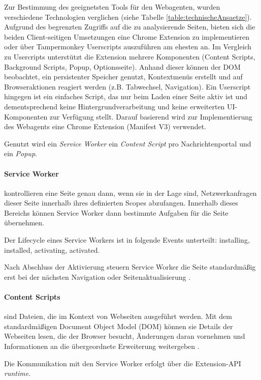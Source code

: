 Zur Bestimmung des geeignetsten Tools für den Webagenten,
wurden verschiedene Technologien verglichen (siehe Tabelle \ref{table:technischeAnsaetze}).
Aufgrund des begrenzten Zugriffs auf die zu analysierende Seiten, bieten sich die beiden Client-seitigen Umsetzungen 
eine Chrome Extension zu implementieren oder über Tampermonkey Userscripts auszuführen am ehesten an.
Im Vergleich zu Usercripts unterstützt die Extension mehrere Komponenten (Content Scripts, Background Scripts, Popup, Optionsseite).
Anhand dieser können der DOM beobachtet, ein persistenter Speicher genutzt, Kontextmenüs erstellt und auf Browseraktionen reagiert werden (z.B. Tabwechsel, Navigation).
Ein Userscript hingegen ist ein einfaches Script, das nur beim Laden einer Seite aktiv ist und dementsprechend keine Hintergrundverarbeitung und keine erweiterten UI-Komponenten
zur Verfügung stellt. Darauf basierend wird zur Implementierung des Webagents eine Chrome Extension (Manifest V3) verwendet.

Genutzt wird ein \textit{Service Worker} ein \textit{Content Script} pro Nachrichtenportal und ein \textit{Popup}.

\paragraph{Service Worker} kontrollieren eine Seite genau dann, wenn sie in der Lage sind, Netzwerkanfragen dieser Seite innerhalb ihres definierten Scopes abzufangen. 
Innerhalb dieses Bereichs können Service Worker dann bestimmte Aufgaben für die Seite übernehmen.

Der Lifecycle eines Service Workers ist in folgende Events unterteilt: installing, installed, activating, activated.

Nach Abschluss der Aktivierung steuern Service Worker die Seite standardmäßig erst 
bei der nächsten Navigation oder Seitenaktualisierung \cite{chrome2025serviceworker}.

\paragraph{Content Scripts} sind Dateien, die im Kontext von Webseiten ausgeführt werden. 
Mit dem standardmäßigen Document Object Model (DOM) können sie Details der Webseiten lesen, die der Browser besucht, 
Änderungen daran vornehmen und Informationen an die übergeordnete Erweiterung weitergeben \cite{chrome2025contentscripts}.

Die Kommunikation mit den Service Worker erfolgt über die Extension-API \textit{runtime}.

